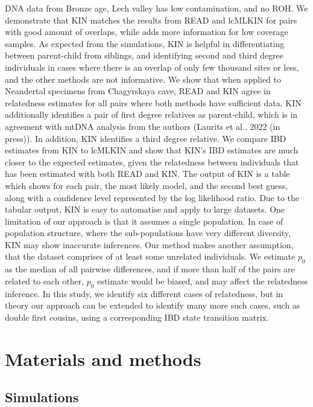 \documentclass[12pt, letterpaper]{article}
\begin{document}
DNA data from Bronze age, Lech valley has low contamination, and no ROH. We demonstrate that KIN matches the results from READ and lcMLKIN for pairs with good amount of overlaps, while adds more information for low coverage samples. As expected from the simulations, KIN is helpful in differentiating between parent-child from siblings, and identifying second and third degree individuals in cases where there is an overlap of only few thousand sites or less, and the other methods are not informative. We show that when applied to Neandertal specimens from Chagyrskaya cave, READ and KIN agree in relatedness estimates for all pairs where both methods have sufficient data. KIN additionally identifies a pair of first degree relatives as parent-child, which is in agreement with mtDNA analysis from the authors (Laurits et al., 2022 (in press)). In addition, KIN identifies a third degree relative. We compare IBD estimates from KIN to lcMLKIN and show that KIN's IBD estimates are much closer to the expected estimates, given the relatedness between individuals that has been estimated with both READ and KIN. 
The output of KIN is a table which shows for each pair, the most likely model, and the second best guess, along with a confidence level represented by the log likelihood ratio. Due to the tabular output, KIN is easy to automatise and apply to large datasets. 
One limitation of our approach is that it assumes a single population. In case of population structure, where the sub-populations have very different diversity, KIN may show inaccurate inferences. Our method makes another assumption, that the dataset comprises of at least some unrelated individuals. We estimate $p_0$ as the median of all pairwise differences, and if more than half of the pairs are related to each other, $p_0$ estimate would be biased, and may affect the relatedness inference. In this study, we identify six different cases of relatedness, but in theory our approach can be extended to identify many more such cases, such as double first cousins, using a corresponding IBD state transition matrix.


\section{Materials and methods}\label{method}

\subsection{Simulations}\label{simulat}
\end{document}
